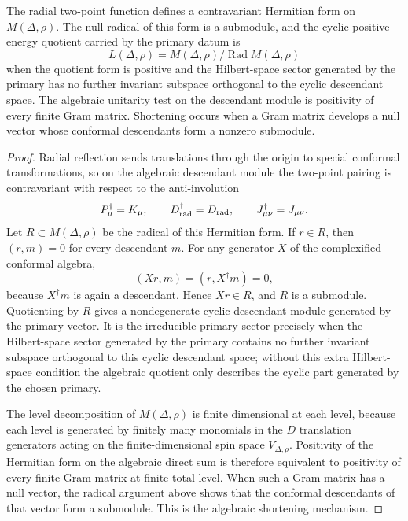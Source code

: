 \begin{proposition}
\label{prop:conformal-null-quotient-unitarity-test}
The radial two-point function defines a
contravariant Hermitian form on \(M(\Delta,\rho)\).  The null radical of this
form is a submodule, and the cyclic positive-energy quotient carried by the
primary datum is
\begin{equation}
  L(\Delta,\rho)=M(\Delta,\rho)/\operatorname{Rad}M(\Delta,\rho)
  \label{eq:chapter2-conformal-irreducible-null-quotient}
\end{equation}
when the quotient form is positive and the Hilbert-space sector generated by
the primary has no further invariant subspace orthogonal to the cyclic
descendant space.  The algebraic unitarity test on the descendant module is
positivity of every finite Gram matrix.  Shortening occurs when a Gram matrix
develops a null vector whose conformal descendants form a nonzero submodule.
\end{proposition}

\begin{proof}
Radial reflection sends translations through the origin to special conformal
transformations, so on the algebraic descendant module the two-point pairing
is contravariant with respect to the anti-involution
\[
  P_\mu^\dagger=K_\mu,\qquad
  D_{\rm rad}^\dagger=D_{\rm rad},\qquad
  J_{\mu\nu}^\dagger=J_{\mu\nu}.
\]
Let \(R\subset M(\Delta,\rho)\) be the radical of this Hermitian form.  If
\(r\in R\), then \((r,m)=0\) for every descendant \(m\).  For any generator
\(X\) of the complexified conformal algebra,
\[
  (Xr,m)=(r,X^\dagger m)=0,
\]
because \(X^\dagger m\) is again a descendant.  Hence \(Xr\in R\), and
\(R\) is a submodule.  Quotienting by \(R\) gives a nondegenerate cyclic
descendant module generated by the primary vector.  It is the irreducible
primary sector precisely when the Hilbert-space sector generated by the
primary contains no further invariant subspace orthogonal to this cyclic
descendant space; without this extra Hilbert-space condition the algebraic
quotient only describes the cyclic part generated by the chosen primary.

The level decomposition of \(M(\Delta,\rho)\) is finite dimensional at each
level, because each level is generated by finitely many monomials in the
\(D\) translation generators acting on the finite-dimensional spin space
\(V_{\Delta,\rho}\).  Positivity of the Hermitian form on the algebraic direct
sum is therefore equivalent to positivity of every finite Gram matrix at
finite total level.  When such a Gram matrix has a null vector, the radical
argument above shows that the conformal descendants of that vector form a
submodule.  This is the algebraic shortening mechanism.
\end{proof}


